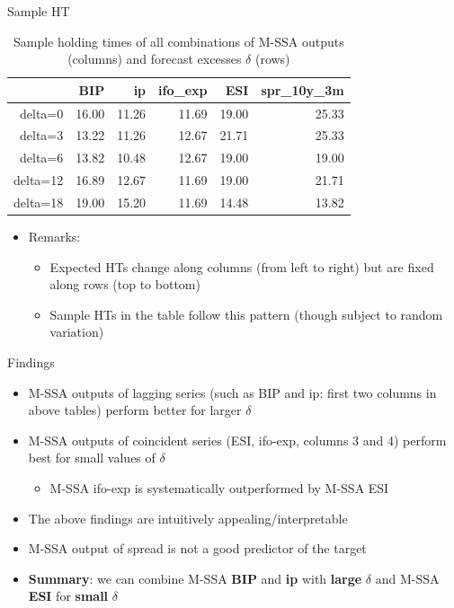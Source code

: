 \documentclass{beamer}
\begin{document}
\begin{frame} {Sample HT}\label{htzc3}
\begin{table}[ht]
\centering
\begin{tabular}{rrrrrr}
  \hline
 & BIP & ip & ifo\_exp & ESI & spr\_10y\_3m \\ 
  \hline
delta=0 & 16.00 & 11.26 & 11.69 & 19.00 & 25.33 \\ 
  delta=3 & 13.22 & 11.26 & 12.67 & 21.71 & 25.33 \\ 
  delta=6 & 13.82 & 10.48 & 12.67 & 19.00 & 19.00 \\ 
  delta=12 & 16.89 & 12.67 & 11.69 & 19.00 & 21.71 \\ 
  delta=18 & 19.00 & 15.20 & 11.69 & 14.48 & 13.82 \\ 
   \hline
\end{tabular}
\caption{Sample holding times of all combinations of M-SSA outputs (columns) and forecast excesses $\delta$ (rows)} 
\label{perf_var1}
\end{table}\begin{itemize}
\item Remarks:
\begin{itemize}
\item Expected HTs change along columns (from left to right) but are fixed along rows (top to bottom)
\item Sample HTs in the table follow this pattern (though subject to random variation)
\end{itemize}
\end{itemize}

\end{frame}



\begin{frame} {Findings}
\begin{itemize}
\item M-SSA outputs of lagging series (such as BIP and ip: first two columns in above tables) perform better for larger $\delta$
\item M-SSA outputs of coincident series (ESI, ifo-exp, columns 3 and 4) perform best for small values of $\delta$
\begin{itemize}
\item M-SSA ifo-exp is systematically outperformed by M-SSA ESI
\end{itemize}
\item The above findings are intuitively appealing/interpretable
\item M-SSA output of spread is not a good predictor of the target
\item \textbf{Summary}: we can combine M-SSA \textbf{BIP} and \textbf{ip} with \textbf{large} $\delta$ and M-SSA \textbf{ESI} for \textbf{small} $\delta$
\end{itemize}
\end{frame}
\end{document}
